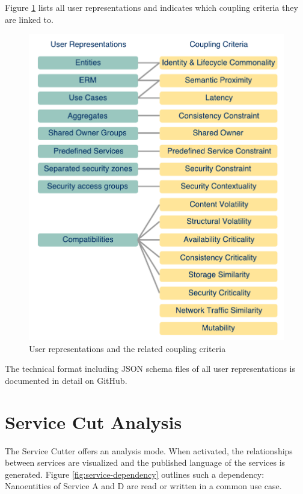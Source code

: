 Figure \ref{fig:userrep} lists all user representations and indicates which coupling criteria they are linked to.

\begin{figure}[H]
	\begin{center}
		\includegraphics[scale=0.6]{diagrams/UserRep-CC.pdf}
		\caption{User representations and the related coupling criteria}
		\label{fig:userrep}
	\end{center}
\end{figure}

The technical format including \gls{JSON} schema files of all user representations is documented in detail on GitHub\cite{githubWiki}.

\section{Service Cut Analysis}

The Service Cutter offers an analysis mode. When activated, the relationships between services are visualized and the published language of the services is generated. Figure \ref{fig:service-dependency} outlines such a dependency: Nanoentities of Service A and D are read or written in a common use case. 

